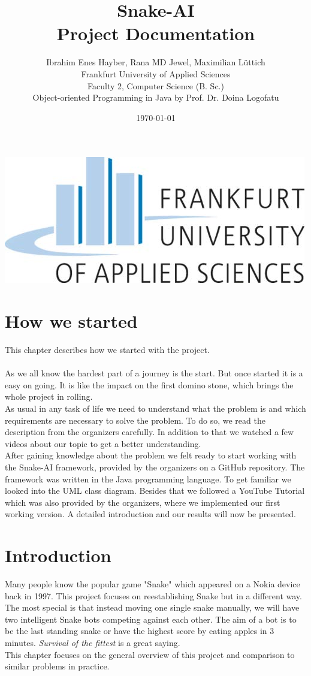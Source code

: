 \documentclass[a4paper,12pt]{article}
\title{Snake-AI\\Project Documentation}
\author{
		Ibrahim Enes Hayber, Rana MD Jewel, Maximilian Lüttich\\
		Frankfurt University of Applied Sciences\\
		Faculty 2, Computer Science (B. Sc.)\\
		Object-oriented Programming in Java by Prof. Dr. Doina Logofatu
}
\date{\today}
\begin{document}
\maketitle
\begin{center}
\includegraphics[scale=0.8]{fra-uas-logo}
\end{center}
\newpage
\tableofcontents

\newpage
\section{How we started}
This chapter describes how we started with the project.\\
\\As we all know the hardest part of a journey is the start. But once started it is a easy on going.
It is like the impact on the first domino stone, which brings the whole project in rolling.
\\As usual in any task of life we need to understand what the problem is and which requirements are necessary to solve the problem. To do so, we read the description from the organizers carefully. In addition to that we watched a few videos about our topic to get a better understanding.\\
After gaining knowledge about the problem we felt ready to start working with the Snake-AI framework, provided by the organizers on a GitHub repository. The framework was written in the Java programming language. To get familiar we looked into the UML class
diagram. Besides that we followed a YouTube Tutorial which was also provided by the organizers, where we implemented our first working version. A detailed introduction and our results will now be presented.
\newpage

\section{Introduction}
Many people know the popular game "Snake" which appeared on a Nokia device back in 1997.
This project focuses on reestablishing Snake but in a different way. 
The most special is that instead moving one single snake manually, we will have two intelligent Snake bots competing against each other.
The aim of a bot is to be the last standing snake or have the highest score by eating apples in 3 minutes. 
\textit{Survival of the fittest} is a great saying.\\
This chapter focuses on the general overview of this project and comparison to similar problems in practice.
\end{document}
